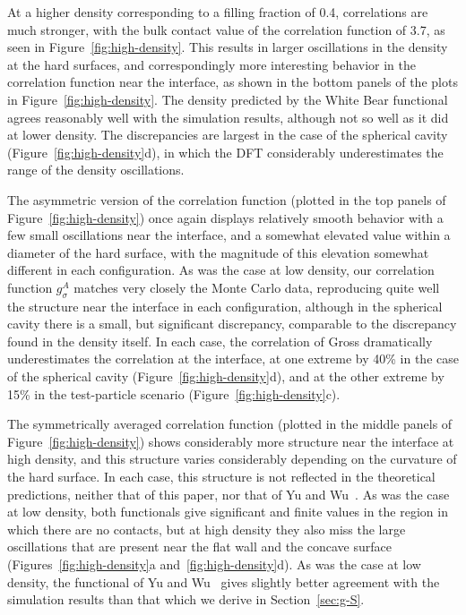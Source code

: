 At a higher density corresponding to a filling fraction of 0.4,
correlations are much stronger, with the bulk contact value of the
correlation function of 3.7, as seen in Figure~\ref{fig:high-density}.
This results in larger oscillations in the density at the hard
surfaces, and correspondingly more interesting behavior in the
correlation function near the interface, as shown in the bottom panels
of the plots in Figure~\ref{fig:high-density}.  The density predicted
by the White Bear functional agrees reasonably well with the
simulation results, although not so well as it did at lower density.
The discrepancies are largest in the case of the spherical cavity
(Figure~\ref{fig:high-density}d), in which the DFT considerably
underestimates the range of the density oscillations.

The asymmetric version of the correlation function (plotted
in the top panels of Figure~\ref{fig:high-density}) once again displays
relatively smooth behavior with a few small
oscillations near the interface, and a somewhat elevated value within
a diameter of the hard surface, with the magnitude of this elevation
somewhat different in each configuration.  As was the case at low
density, our correlation function $g_\sigma^A$ matches very closely
the Monte Carlo data, reproducing quite well the structure near the
interface in each configuration, although in the spherical cavity there is a small, but significant
discrepancy, comparable to the discrepancy found in the density
itself.  In each case, the correlation of Gross dramatically
underestimates the correlation at the interface, at one extreme by
40\% in the case of the spherical cavity
(Figure~\ref{fig:high-density}d), and at the other extreme by 15\%
in the test-particle scenario (Figure~\ref{fig:high-density}c).


The symmetrically averaged correlation function (plotted
in the middle panels of Figure~\ref{fig:high-density}) shows considerably
more structure near the interface at high density, and this structure
varies considerably depending on the curvature of the hard surface.
In each case, this structure is not reflected in the theoretical
predictions, neither that of this paper, nor that of Yu and
Wu~\cite{yu2002fmt-dft-inhomogeneous-associating}.  As was the case at
low density, both functionals give significant and finite values in
the region in which there are no contacts, but at high density they
also miss the large oscillations that are present near the flat wall
and the concave surface (Figures~\ref{fig:high-density}a
and~\ref{fig:high-density}d).  As was the case at low density, the
functional of Yu and Wu~\cite{yu2002fmt-dft-inhomogeneous-associating}
gives slightly better agreement with the simulation results than that
which we derive in Section~\ref{sec:g-S}.


